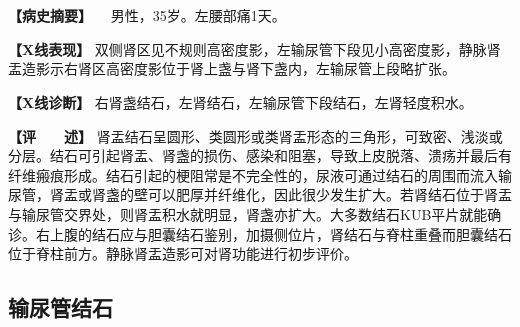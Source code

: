 \begin{figure}
    \centering
    \\
    \\
    \caption{}
    \label{fig6-3-2}
\end{figure}



\textbf{【病史摘要】} 　男性，35岁。左腰部痛1天。

\textbf{【X线表现】}
双侧肾区见不规则高密度影，左输尿管下段见小高密度影，静脉肾盂造影示右肾区高密度影位于肾上盏与肾下盏内，左输尿管上段略扩张。

\textbf{【X线诊断】}
右肾盏结石，左肾结石，左输尿管下段结石，左肾轻度积水。

\textbf{【评　　述】}
肾盂结石呈圆形、类圆形或类肾盂形态的三角形，可致密、浅淡或分层。结石可引起肾盂、肾盏的损伤、感染和阻塞，导致上皮脱落、溃疡并最后有纤维瘢痕形成。结石引起的梗阻常是不完全性的，尿液可通过结石的周围而流入输尿管，肾盂或肾盏的壁可以肥厚并纤维化，因此很少发生扩大。若肾结石位于肾盂与输尿管交界处，则肾盂积水就明显，肾盏亦扩大。大多数结石KUB平片就能确诊。右上腹的结石应与胆囊结石鉴别，加摄侧位片，肾结石与脊柱重叠而胆囊结石位于脊柱前方。静脉肾盂造影可对肾功能进行初步评价。

\subsection{输尿管结石}

\begin{figure}
    \centering
    \\
    \caption{}
    \label{fig6-3-3}
\end{figure}

